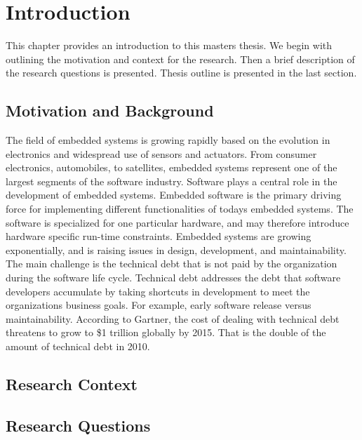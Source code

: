 
\chapter{Introduction}

This chapter provides an introduction to this masters thesis. We begin with outlining the motivation and context for the research. Then a brief description of the research questions is presented. Thesis outline is presented in the last section.


\section{Motivation and Background}
The field of embedded systems is growing rapidly based on the evolution in electronics and widespread use of sensors and actuators. From consumer electronics, automobiles, to satellites, embedded systems represent one of the largest segments of the software industry. Software plays a central role in the development of embedded systems. Embedded software is the primary driving force for implementing different functionalities of todays embedded systems. The software is specialized for one particular hardware, and may therefore introduce hardware specific run-time constraints. Embedded systems are growing exponentially\cite{graaf2003embedded}, and is raising issues in design, development, and maintainability. The main challenge is the technical debt that is not paid by the organization during the software life cycle. Technical debt addresses the debt that software developers accumulate by taking shortcuts in development to meet the organizations business goals. For example, early software release versus maintainability. According to Gartner\cite{gartner2010}, the cost of dealing with technical debt threatens to grow to \$1 trillion globally by 2015. That is the double of the amount of technical debt in 2010. 



\section{Research Context}


\section{Research Questions}


